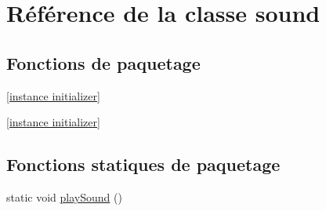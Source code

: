 \hypertarget{classsound}{\section{Référence de la classe sound}
\label{classsound}
}
\subsection*{Fonctions de paquetage}
\begin{DoxyCompactItemize}
\item 
\hyperlink{classsound_a8dc4d520438ad33e939003f73fe5e2fa}{\mbox{[}instance initializer\mbox{]}}
\item 
\hyperlink{classsound_a8dc4d520438ad33e939003f73fe5e2fa}{\mbox{[}instance initializer\mbox{]}}
\end{DoxyCompactItemize}
\subsection*{Fonctions statiques de paquetage}
\begin{DoxyCompactItemize}
\item 
static void \hyperlink{classsound_a85417da4e48125bff8b3a49f6390ded9}{play\-Sound} ()
\end{DoxyCompactItemize}


